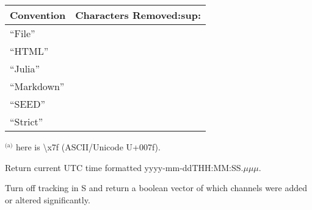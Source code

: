 \documentclass[letterpaper,11pt,english]{sphinxmanual}
\begin{document}
\begin{savenotes}\sphinxattablestart
\centering
\begin{tabulary}{\linewidth}[t]{|T|T|}
\hline
\sphinxstyletheadfamily 
Convention
&\sphinxstyletheadfamily 
Characters Removed:sup:
\\
\hline
“File”
&
\\
\hline
“HTML”
&
\\
\hline
“Julia”
&
\\
\hline
“Markdown”
&
\\
\hline
“SEED”
&
\\
\hline
“Strict”
&
\\
\hline
\end{tabulary}
\par
\sphinxattableend\end{savenotes}

$^{\text{(a)}}$  here is \textbackslash{}x7f (ASCII/Unicode U+007f).

\begin{fulllineitems}
\label{\detokenize{src/working_with_data:timestamp}}
\end{fulllineitems}


Return current UTC time formatted yyyy-mm-ddTHH:MM:SS.\(\mu\)\(\mu\)\(\mu\).


\begin{fulllineitems}
\end{fulllineitems}


Turn off tracking in S and return a boolean vector of which channels were added
or altered significantly.


\begin{fulllineitems}
\end{fulllineitems}
\end{document}
